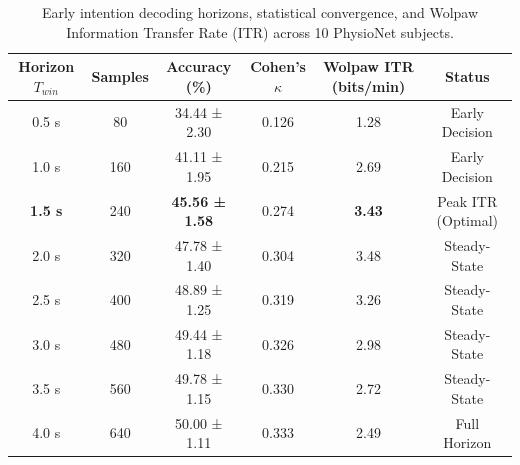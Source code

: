 \begin{table}[t]
\centering
\caption{Early intention decoding horizons, statistical convergence, and Wolpaw Information Transfer Rate (ITR) across 10 PhysioNet subjects.}
\label{tab:early_detection}
\small
\begin{tabular}{cccccc}
\toprule
\textbf{Horizon $T_{win}$} & \textbf{Samples} & \textbf{Accuracy (\%)} & \textbf{Cohen's $\kappa$} & \textbf{Wolpaw ITR (bits/min)} & \textbf{Status} \\
\midrule
0.5 s & 80 & 34.44 ± 2.30 & 0.126 & 1.28 & Early Decision \\
1.0 s & 160 & 41.11 ± 1.95 & 0.215 & 2.69 & Early Decision \\
\textbf{1.5 s} & 240 & \textbf{45.56 ± 1.58} & 0.274 & \textbf{3.43} & Peak ITR (Optimal) \\
2.0 s & 320 & 47.78 ± 1.40 & 0.304 & 3.48 & Steady-State \\
2.5 s & 400 & 48.89 ± 1.25 & 0.319 & 3.26 & Steady-State \\
3.0 s & 480 & 49.44 ± 1.18 & 0.326 & 2.98 & Steady-State \\
3.5 s & 560 & 49.78 ± 1.15 & 0.330 & 2.72 & Steady-State \\
4.0 s & 640 & 50.00 ± 1.11 & 0.333 & 2.49 & Full Horizon \\
\bottomrule
\end{tabular}
\end{table}
